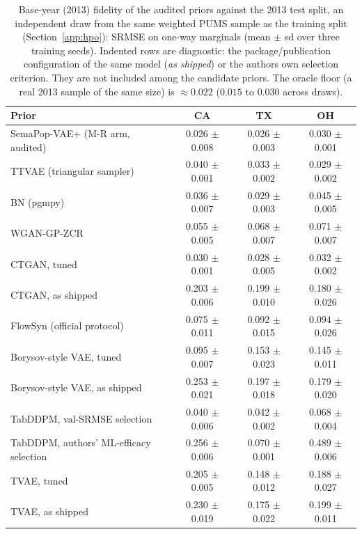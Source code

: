 \begin{table}[htbp]
\centering
\small
\caption{Base-year (2013) fidelity of the audited priors against the 2013 test split, an independent draw from the same weighted PUMS sample as the training split (Section~\ref{app:hpo}): SRMSE on one-way marginals (mean $\pm$ sd over three training seeds). Indented rows are diagnostic: the package/publication configuration of the same model (\emph{as shipped}) or the authors\textquotesingle{} own selection criterion. They are not included among the candidate priors. The oracle floor (a real 2013 sample of the same size) is $\approx 0.022$ ($0.015$ to $0.030$ across draws).}
\label{tab:fidelity-v3}
\begin{tabular}{@{}lccc@{}}
\toprule
Prior & CA & TX & OH \\
\midrule
SemaPop-VAE+ (M-R arm, audited) & 0.026 $\pm$ 0.008 & 0.026 $\pm$ 0.003 & 0.030 $\pm$ 0.001 \\
TTVAE (triangular sampler) & 0.040 $\pm$ 0.001 & 0.033 $\pm$ 0.002 & 0.029 $\pm$ 0.002 \\
BN (pgmpy) & 0.036 $\pm$ 0.007 & 0.029 $\pm$ 0.003 & 0.045 $\pm$ 0.005 \\
WGAN-GP-ZCR & 0.055 $\pm$ 0.005 & 0.068 $\pm$ 0.007 & 0.071 $\pm$ 0.007 \\
CTGAN, tuned & 0.030 $\pm$ 0.001 & 0.028 $\pm$ 0.005 & 0.032 $\pm$ 0.002 \\
\quad CTGAN, as shipped & 0.203 $\pm$ 0.006 & 0.199 $\pm$ 0.010 & 0.180 $\pm$ 0.026 \\
FlowSyn (official protocol) & 0.075 $\pm$ 0.011 & 0.092 $\pm$ 0.015 & 0.094 $\pm$ 0.026 \\
Borysov-style VAE, tuned & 0.095 $\pm$ 0.007 & 0.153 $\pm$ 0.023 & 0.145 $\pm$ 0.011 \\
\quad Borysov-style VAE, as shipped & 0.253 $\pm$ 0.021 & 0.197 $\pm$ 0.018 & 0.179 $\pm$ 0.020 \\
TabDDPM, val-SRMSE selection & 0.040 $\pm$ 0.006 & 0.042 $\pm$ 0.002 & 0.068 $\pm$ 0.004 \\
\quad TabDDPM, authors' ML-efficacy selection & 0.256 $\pm$ 0.006 & 0.070 $\pm$ 0.001 & 0.489 $\pm$ 0.006 \\
TVAE, tuned & 0.205 $\pm$ 0.005 & 0.148 $\pm$ 0.012 & 0.188 $\pm$ 0.027 \\
\quad TVAE, as shipped & 0.230 $\pm$ 0.019 & 0.175 $\pm$ 0.022 & 0.199 $\pm$ 0.011 \\
\bottomrule
\end{tabular}
\end{table}
